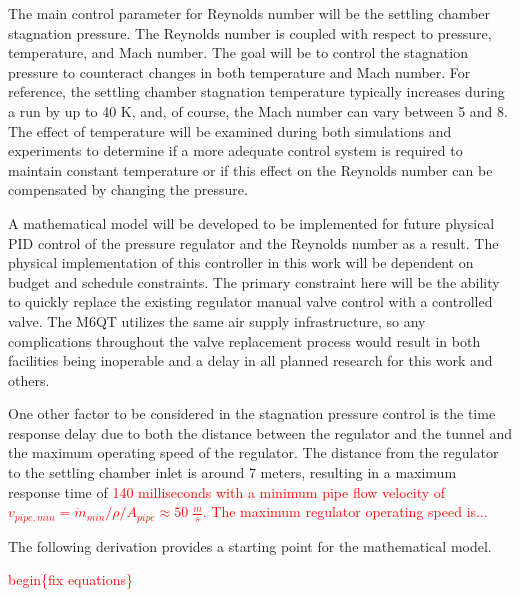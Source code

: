 The main control parameter for Reynolds number will be the settling chamber stagnation pressure. The Reynolds number is coupled with respect to pressure, temperature, and Mach number. The goal will be to control the stagnation pressure to counteract changes in both temperature and Mach number. For reference, the settling chamber stagnation temperature typically increases during a run by up to 40 K, and, of course, the Mach number can vary between 5 and 8. The effect of temperature will be examined during both simulations and experiments to determine if a more adequate control system is required to maintain constant temperature or if this effect on the Reynolds number can be compensated by changing the pressure.

A mathematical model will be developed to be implemented for future physical PID control of the pressure regulator and the Reynolds number as a result. The physical implementation of this controller in this work will be dependent on budget and schedule constraints. The primary constraint here will be the ability to quickly replace the existing regulator manual valve control with a controlled valve. The M6QT utilizes the same air supply infrastructure, so any complications throughout the valve replacement process would result in both facilities being inoperable and a delay in all planned research for this work and others.

One other factor to be considered in the stagnation pressure control is the time response delay due to both the distance between the regulator and the tunnel and the maximum operating speed of the regulator. The distance from the regulator to the settling chamber inlet is around 7 meters, resulting in a maximum response time of \textcolor{red}{140 milliseconds with a minimum pipe flow velocity of $v_{pipe,min} = \dot{m}_{min}/\rho/A_{pipe} \approx 50 \; \frac{m}{s}$. The maximum regulator operating speed is...}

The following derivation provides a starting point for the mathematical model.

\textcolor{red}{begin\{fix equations\}}

